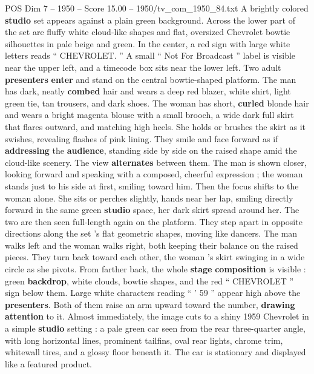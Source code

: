 \begin{textsample}{POS Dim 7 – 1950 – Score 15.00 – 1950/tv\_com\_1950\_84.txt}  \label{ex:f7_pos_017}
A brightly colored \textbf{studio} set appears against a plain green background.
Across the lower part of the set are fluffy white cloud-like shapes and flat, oversized Chevrolet bowtie silhouettes in pale beige and green.
In the center, a red sign with large white letters reads “ CHEVROLET. ” A small “ Not For Broadcast ” label is visible near the upper left, and a timecode box sits near the lower left.
Two adult \textbf{presenters} \textbf{enter} and stand on the central bowtie-shaped platform.
The man has dark, neatly \textbf{combed} hair and wears a deep red blazer, white shirt, light green tie, tan trousers, and dark shoes.
The woman has short, \textbf{curled} blonde hair and wears a bright magenta blouse with a small brooch, a wide dark full skirt that flares outward, and matching high heels.
She holds or brushes the skirt as it swishes, revealing flashes of pink lining.
They smile and face forward as if \textbf{addressing} the \textbf{audience}, standing side by side on the raised shape amid the cloud-like scenery.
The view \textbf{alternates} between them.
The man is shown closer, looking forward and speaking with a composed, cheerful expression ; the woman stands just to his side at first, smiling toward him.
Then the focus shifts to the woman alone.
She sits or perches slightly, hands near her lap, smiling directly forward in the same green \textbf{studio} space, her dark skirt spread around her.
The two are then seen full-length again on the platform.
They step apart in opposite directions along the set ’s flat geometric shapes, moving like dancers.
The man walks left and the woman walks right, both keeping their balance on the raised pieces.
They turn back toward each other, the woman ’s skirt swinging in a wide circle as she pivots.
From farther back, the whole \textbf{stage} \textbf{composition} is visible : green \textbf{backdrop}, white clouds, bowtie shapes, and the red “ CHEVROLET ” sign below them.
Large white characters reading “ ’ 59 ” appear high above the \textbf{presenters}.
Both of them raise an arm upward toward the number, \textbf{drawing} \textbf{attention} to it.
Almost immediately, the image cuts to a shiny 1959 Chevrolet in a simple \textbf{studio} setting : a pale green car seen from the rear three-quarter angle, with long horizontal lines, prominent tailfins, oval rear lights, chrome trim, whitewall tires, and a glossy floor beneath it.
The car is stationary and displayed like a featured product.

\end{textsample}
